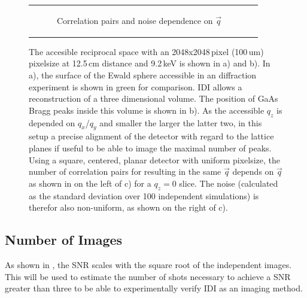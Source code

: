 \begin{figure}[!htb]
\begin{tabular}[t]{cc}
\begin{subfigure}{0.55\textwidth}
	\caption{Correlation pairs and noise dependence on $\vec{q}$ } 
\end{subfigure}\\
	\end{tabular}
	\caption[Accessible reciprocal space]{The accesible reciprocal space with an 2048x2048\,pixel (100\,um) pixelsize at 12.5\,cm distance and 9.2\,keV is shown in a) and b). In a), the surface of the Ewald sphere accessible in an diffraction experiment is shown in green for comparison. IDI allows a reconstruction of a three dimensional volume. The position of GaAs Bragg peaks inside this volume is shown in b). As the accessible $q_z$ is depended on $q_x$/$q_y$ and smaller the larger the latter two, in this setup a precise alignment of the detector with regard to the lattice planes if useful to be able to image the maximal number of peaks. Using a square, centered, planar detector with uniform pixelsize, the number of correlation pairs for resulting in the same $\vec{q}$ depends on $\vec{q}$ as shown in on the left of c) for a $q_z=0$ slice. The noise (calculated as the standard deviation over 100 independent simulations) is therefor also non-uniform, as shown on the right of c).}
\end{figure}



\subsection{Number of Images}
As shown in , the SNR scales with  the square root of the independent images. This will be used to estimate the number of shots necessary to achieve a SNR greater than three to be able to experimentally verify IDI as an imaging method.
 
